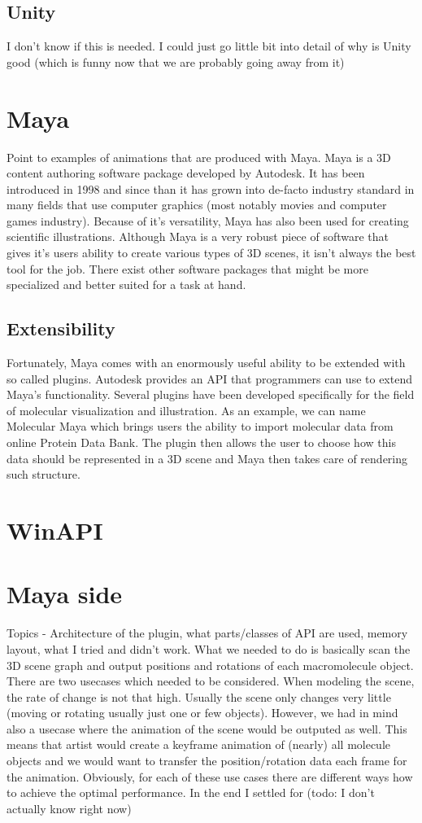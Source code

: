 \documentclass[
  digital, %
  table,   %
  lof,     %
  lot,     %
]{fithesis3}
\begin{document}
{\subsection{Unity}
I don't know if this is needed. I could just go little bit into detail of why is Unity good (which is funny now that we are probably going away from it)
\section{Maya}
Point to examples of animations that are produced with Maya.
Maya is a 3D content authoring software package developed by Autodesk. It has been introduced in 1998 and since than it has grown into de-facto industry standard in many fields that use computer graphics (most notably movies and computer games industry). Because of it's versatility, Maya has also been used for creating scientific illustrations.
Although Maya is a very robust piece of software that gives it's users ability to create various types of 3D scenes, it isn't always the best tool for the job. There exist other software packages that might be more specialized and better suited for a task at hand.
\subsection{Extensibility}
Fortunately, Maya comes with an enormously useful ability to be extended with so called plugins. Autodesk provides an API that programmers can use to extend Maya's functionality.
Several plugins have been developed specifically for the field of molecular visualization and illustration. As an example, we can name Molecular Maya which brings users the ability to import molecular data from online Protein Data Bank. The plugin then allows the user to choose how this data should be represented in a 3D scene and Maya then takes care of rendering such structure.

\section{WinAPI}
\section{Maya side}
Topics - Architecture of the plugin, what parts/classes of API are used, memory layout, what I tried and didn't work.
What we needed to do is basically scan the 3D scene graph and output positions and rotations of each macromolecule object. There are two usecases which needed to be considered. When modeling the scene, the rate of change is not that high. Usually the scene only changes very little (moving or rotating usually just one or few objects). However, we had in mind also a usecase where the animation of the scene would be outputed as well. This means that artist would create a keyframe animation of (nearly) all molecule objects and we would want to transfer the position/rotation data each frame for the animation. Obviously, for each of these use cases there are different ways how to achieve the optimal performance. In the end I settled for (todo: I don't actually know right now)
}
\end{document}
